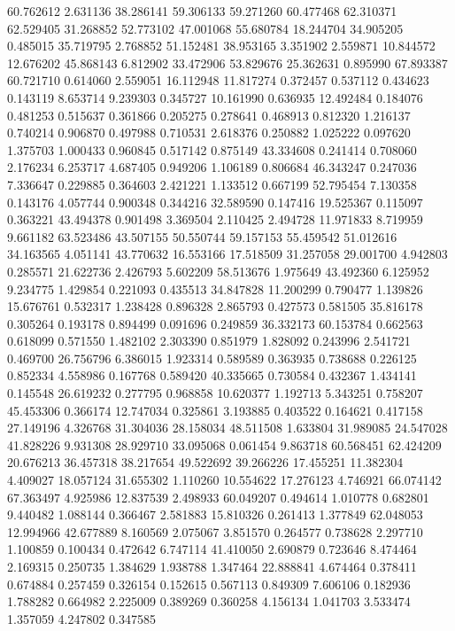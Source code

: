 60.762612
2.631136
38.286141
59.306133
59.271260
60.477468
62.310371
62.529405
31.268852
52.773102
47.001068
55.680784
18.244704
34.905205
0.485015
35.719795
2.768852
51.152481
38.953165
3.351902
2.559871
10.844572
12.676202
45.868143
6.812902
33.472906
53.829676
25.362631
0.895990
67.893387
60.721710
0.614060
2.559051
16.112948
11.817274
0.372457
0.537112
0.434623
0.143119
8.653714
9.239303
0.345727
10.161990
0.636935
12.492484
0.184076
0.481253
0.515637
0.361866
0.205275
0.278641
0.468913
0.812320
1.216137
0.740214
0.906870
0.497988
0.710531
2.618376
0.250882
1.025222
0.097620
1.375703
1.000433
0.960845
0.517142
0.875149
43.334608
0.241414
0.708060
2.176234
6.253717
4.687405
0.949206
1.106189
0.806684
46.343247
0.247036
7.336647
0.229885
0.364603
2.421221
1.133512
0.667199
52.795454
7.130358
0.143176
4.057744
0.900348
0.344216
32.589590
0.147416
19.525367
0.115097
0.363221
43.494378
0.901498
3.369504
2.110425
2.494728
11.971833
8.719959
9.661182
63.523486
43.507155
50.550744
59.157153
55.459542
51.012616
34.163565
4.051141
43.770632
16.553166
17.518509
31.257058
29.001700
4.942803
0.285571
21.622736
2.426793
5.602209
58.513676
1.975649
43.492360
6.125952
9.234775
1.429854
0.221093
0.435513
34.847828
11.200299
0.790477
1.139826
15.676761
0.532317
1.238428
0.896328
2.865793
0.427573
0.581505
35.816178
0.305264
0.193178
0.894499
0.091696
0.249859
36.332173
60.153784
0.662563
0.618099
0.571550
1.482102
2.303390
0.851979
1.828092
0.243996
2.541721
0.469700
26.756796
6.386015
1.923314
0.589589
0.363935
0.738688
0.226125
0.852334
4.558986
0.167768
0.589420
40.335665
0.730584
0.432367
1.434141
0.145548
26.619232
0.277795
0.968858
10.620377
1.192713
5.343251
0.758207
45.453306
0.366174
12.747034
0.325861
3.193885
0.403522
0.164621
0.417158
27.149196
4.326768
31.304036
28.158034
48.511508
1.633804
31.989085
24.547028
41.828226
9.931308
28.929710
33.095068
0.061454
9.863718
60.568451
62.424209
20.676213
36.457318
38.217654
49.522692
39.266226
17.455251
11.382304
4.409027
18.057124
31.655302
1.110260
10.554622
17.276123
4.746921
66.074142
67.363497
4.925986
12.837539
2.498933
60.049207
0.494614
1.010778
0.682801
9.440482
1.088144
0.366467
2.581883
15.810326
0.261413
1.377849
62.048053
12.994966
42.677889
8.160569
2.075067
3.851570
0.264577
0.738628
2.297710
1.100859
0.100434
0.472642
6.747114
41.410050
2.690879
0.723646
8.474464
2.169315
0.250735
1.384629
1.938788
1.347464
22.888841
4.674464
0.378411
0.674884
0.257459
0.326154
0.152615
0.567113
0.849309
7.606106
0.182936
1.788282
0.664982
2.225009
0.389269
0.360258
4.156134
1.041703
3.533474
1.357059
4.247802
0.347585
